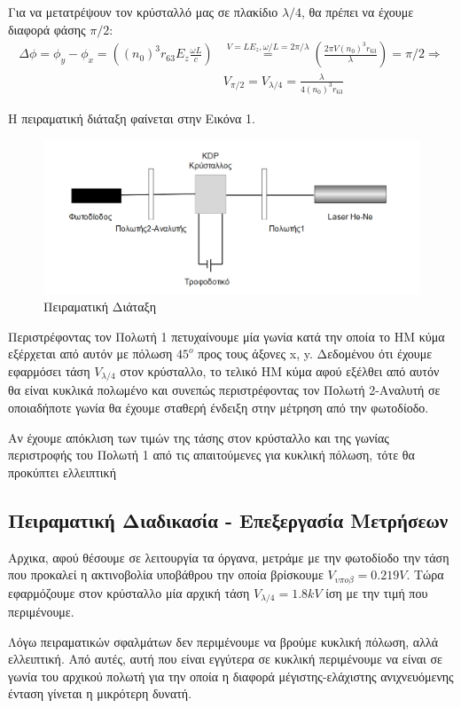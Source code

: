 \documentclass[a4paper]{article}
\begin{document}
	Για να μετατρέψουν τον κρύσταλλό μας σε πλακίδιο $\lambda/4$, θα πρέπει να έχουμε διαφορά φάσης $\pi/2$: 
	\begin{align*}
		\Delta\phi = \phi_y-\phi_x = \left( (n_0)^3 r_{63}E_z \frac{\omega L}{c} \right) &\stackrel{V=LE_z,\omega/L=2\pi/\lambda}{=}	\left(\frac{2\pi V(n_0)^3r_{63}}{\lambda}\right) = \pi/2 \Rightarrow \\ 
		   &V_{\pi/2} = V_{\lambda/4} = \frac{\lambda}{4(n_0)^3r_{63}}
		\end{align*}
		
		Η πειραματική διάταξη φαίνεται στην Εικόνα 1. 
		\begin{figure}[h!]
			\centering
			\includegraphics[scale=0.5]{pockels.png}
			\caption{ Πειραματική Διάταξη}
		\end{figure}
		
	Περιστρέφοντας τον Πολωτή 1 πετυχαίνουμε μία γωνία κατά την οποία το ΗΜ κύμα εξέρχεται από αυτόν με πόλωση $45^o$ προς τους άξονες x, y. Δεδομένου ότι έχουμε εφαρμόσει τάση $V_{\lambda/4}$ στον κρύσταλλο, το τελικό ΗΜ κύμα αφού εξέλθει από αυτόν θα είναι κυκλικά πολωμένο και συνεπώς περιστρέφοντας τον Πολωτή 2-Αναλυτή σε οποιαδήποτε γωνία θα έχουμε σταθερή ένδειξη στην μέτρηση από την φωτοδίοδο.
	
	Αν έχουμε απόκλιση των τιμών της τάσης στον κρύσταλλο και της γωνίας περιστροφής του Πολωτή 1 από τις απαιτούμενες για κυκλική πόλωση, τότε θα προκύπτει ελλειπτική 
\subsection*{Πειραματική Διαδικασία - Επεξεργασία Μετρήσεων}

	Αρχικα, αφού θέσουμε σε λειτουργία τα όργανα, μετράμε με την φωτοδίοδο την τάση που προκαλεί η ακτινοβολία υποβάθρου την οποία βρίσκουμε $V_{υποβ}=0.219V$. Τώρα εφαρμόζουμε στον κρύσταλλο μία αρχική τάση $V_{\lambda/4}=1.8kV $ ίση με την τιμή που περιμένουμε.
	
	Λόγω πειραματικών σφαλμάτων δεν περιμένουμε να βρούμε κυκλική πόλωση, αλλά ελλειπτική. Από αυτές, αυτή που είναι εγγύτερα σε κυκλική περιμένουμε να είναι σε γωνία του αρχικού πολωτή για την οποία η διαφορά μέγιστης-ελάχιστης ανιχνευόμενης ένταση γίνεται η μικρότερη δυνατή.
	
\end{document}

